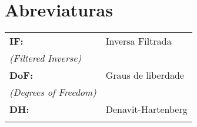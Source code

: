\documentclass[msc,numbers]{formating/coppe}
\begin{document}
\chapter*{Abreviaturas}
\noindent
{\small
\begin{tabular}{lp{12cm}}
{\bf{IF:}} & \raggedright {Inversa Filtrada} \\ {\emph{(Filtered Inverse)}}\tabularnewline
{\bf{DoF:}} & \raggedright {Graus de liberdade} \\ {\emph{(Degrees of Freedom)}}\tabularnewline
{\bf{DH:}} & \raggedright {Denavit-Hartenberg} \\ \tabularnewline
\end{tabular}
}
\mainmatter


	


\backmatter



\appendix


\end{document}

